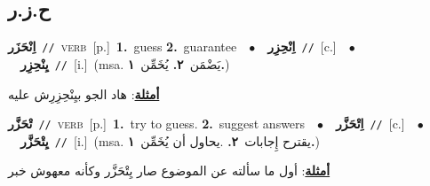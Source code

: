 \documentclass[10pt,a4paper,twoside]{article} %
\begin{document}
\begin{multicols}{2}
\vspace{-3mm}
\subsection*{\color{blue}\foreignlanguage{arabic}{ح.ز.ر}\color{blue}{}} 

{\setlength\topsep{0pt}\textbf{\foreignlanguage{arabic}{اِنْحَزَر}}\ {\color{gray}\texttt{//}\color{black}}\ \textsc{verb}\ [p.]\ \textbf{1.}~guess  \textbf{2.}~guarantee\ \ $\bullet$\ \ \setlength\topsep{0pt}\textbf{\foreignlanguage{arabic}{اِنْحِزِر}}\ {\color{gray}\texttt{//}\color{black}}\ [c.]\ \ $\bullet$\ \ \setlength\topsep{0pt}\textbf{\foreignlanguage{arabic}{يِنْحِزِر}}\ {\color{gray}\texttt{//}\color{black}}\ [i.]\ \color{gray}(msa. \foreignlanguage{arabic}{يَضْمَن}~\foreignlanguage{arabic}{\textbf{٢.}}  \foreignlanguage{arabic}{يُخَمِّن}~\foreignlanguage{arabic}{\textbf{١.}})\color{black}\  \begin{flushright}\color{gray}\foreignlanguage{arabic}{\textbf{\underline{\foreignlanguage{arabic}{أمثلة}}}: هاد الجو بيِنْحِزِرِش عليه}\end{flushright}\color{black}} \vspace{2mm}

{\setlength\topsep{0pt}\textbf{\foreignlanguage{arabic}{تْحَزَّر}}\ {\color{gray}\texttt{//}\color{black}}\ \textsc{verb}\ [p.]\ \textbf{1.}~try to guess.  \textbf{2.}~suggest answers\ \ $\bullet$\ \ \setlength\topsep{0pt}\textbf{\foreignlanguage{arabic}{اِتْحَزَّر}}\ {\color{gray}\texttt{//}\color{black}}\ [c.]\ \ $\bullet$\ \ \setlength\topsep{0pt}\textbf{\foreignlanguage{arabic}{يِتْحَزَّر}}\ {\color{gray}\texttt{//}\color{black}}\ [i.]\ \color{gray}(msa. \foreignlanguage{arabic}{يقترح إِجابات}~\foreignlanguage{arabic}{\textbf{٢.}}  .\foreignlanguage{arabic}{يحاول أن يُخَمِّن}~\foreignlanguage{arabic}{\textbf{١.}})\color{black}\  \begin{flushright}\color{gray}\foreignlanguage{arabic}{\textbf{\underline{\foreignlanguage{arabic}{أمثلة}}}: أول ما سألته عن الموضوع صار يِتْحَزَّر وكأنه معهوش خبر}\end{flushright}\color{black}} \vspace{2mm}


\end{multicols}
\end{document}
